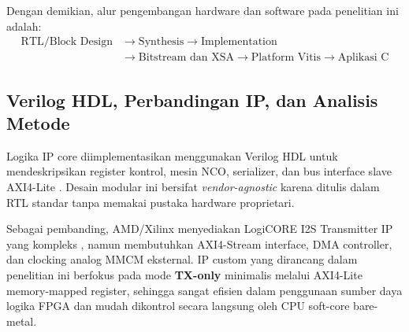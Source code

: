 Dengan demikian, alur pengembangan hardware dan software pada penelitian ini adalah:
\begin{equation}
    \begin{aligned}
        \text{RTL/Block Design} &\rightarrow \text{Synthesis} \rightarrow \text{Implementation} \\
        &\rightarrow \text{Bitstream dan XSA} \rightarrow \text{Platform Vitis} \rightarrow \text{Aplikasi C}
    \end{aligned}
    
\end{equation}

\subsection{Verilog HDL, Perbandingan IP, dan Analisis Metode}

Logika IP core diimplementasikan menggunakan Verilog HDL untuk mendeskripsikan register kontrol, mesin NCO, serializer, dan bus interface slave AXI4-Lite \citep{palnitkar_verilog_2003}. Desain modular ini bersifat \textit{vendor-agnostic} karena ditulis dalam RTL standar tanpa memakai pustaka hardware proprietari. 

Sebagai pembanding, AMD/Xilinx menyediakan LogiCORE I2S Transmitter IP yang kompleks \citep{amd_pg308_i2s_logicore}, namun membutuhkan AXI4-Stream interface, DMA controller, dan clocking analog MMCM eksternal. IP custom yang dirancang dalam penelitian ini berfokus pada mode \textbf{TX-only} minimalis melalui AXI4-Lite memory-mapped register, sehingga sangat efisien dalam penggunaan sumber daya logika FPGA dan mudah dikontrol secara langsung oleh CPU soft-core bare-metal.

